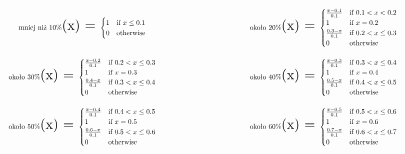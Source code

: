 \documentclass{article}
\begin{document}
\[
\begin{minipage}{0.5\textwidth}
\centering
\text{\scalebox{0.5}{mniej niż 10\%}}(x) = \scalebox{0.5}{$
\begin{cases}
1 & \text{if } x \leq 0.1 \\
0 & \text{otherwise}
\end{cases}
$}
\end{minipage}%
\begin{minipage}{0.5\textwidth}
\centering
\text{\scalebox{0.5}{około 20\%}}(x) = \scalebox{0.5}{$
\begin{cases}
\frac{x - 0.1}{0.1} & \text{if } 0.1 < x < 0.2 \\
1 & \text{if } x = 0.2 \\
\frac{0.3 - x}{0.1} & \text{if } 0.2 < x \leq 0.3 \\
0 & \text{otherwise}
\end{cases}
$}
\end{minipage}
\]
\[
\begin{minipage}{0.5\textwidth}
\centering
\text{\scalebox{0.5}{około 30\%}}(x) = \scalebox{0.5}{$
\begin{cases}
\frac{x - 0.2}{0.1} & \text{if } 0.2 < x \leq 0.3 \\
1 & \text{if } x = 0.3 \\
\frac{0.4 - x}{0.1} & \text{if } 0.3 < x \leq 0.4 \\
0 & \text{otherwise}
\end{cases}
$}
\end{minipage}%
\begin{minipage}{0.5\textwidth}
\centering
\text{\scalebox{0.5}{około 40\%}}(x) = \scalebox{0.5}{$
\begin{cases}
\frac{x - 0.3}{0.1} & \text{if } 0.3 < x \leq 0.4 \\
1 & \text{if } x = 0.4 \\
\frac{0.5 - x}{0.1} & \text{if } 0.4 < x \leq 0.5 \\
0 & \text{otherwise}
\end{cases}
$}
\end{minipage}
\]
\[
\begin{minipage}{0.5\textwidth}
\centering
\text{\scalebox{0.5}{około 50\%}}(x) = \scalebox{0.5}{$
\begin{cases}
\frac{x - 0.4}{0.1} & \text{if } 0.4 < x \leq 0.5 \\
1 & \text{if } x = 0.5 \\
\frac{0.6 - x}{0.1} & \text{if } 0.5 < x \leq 0.6 \\
0 & \text{otherwise}
\end{cases}
$}
\end{minipage}%
\begin{minipage}{0.5\textwidth}
\centering
\text{\scalebox{0.5}{około 60\%}}(x) = \scalebox{0.5}{$
\begin{cases}
\frac{x - 0.5}{0.1} & \text{if } 0.5 < x \leq 0.6 \\
1 & \text{if } x = 0.6 \\
\frac{0.7 - x}{0.1} & \text{if } 0.6 < x \leq 0.7 \\
0 & \text{otherwise}
\end{cases}
$}
\end{minipage}
\]
\end{document}
